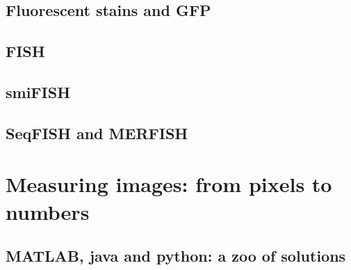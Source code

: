 
\subsection{Fluorescent stains and \ac{GFP}}

\subsection{\ac{FISH}}

\subsection{\ac{smiFISH}}

\subsection{\ac{SeqFISH} and \ac{MERFISH}}

\section{Measuring images: from pixels to numbers}
\label{sec:computation_biology}

\subsection{MATLAB, java and python: a zoo of solutions}

